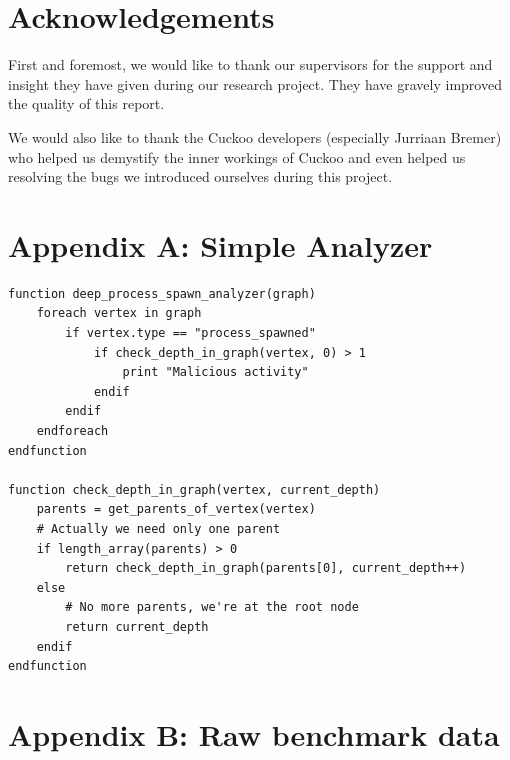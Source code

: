 \documentclass{scrartcl}
\begin{document}
\clearpage

\section*{Acknowledgements}

First and foremost, we would like to thank our supervisors for the support and insight they have given during our research project. They have gravely improved the quality of this report.

We would also like to thank the Cuckoo developers (especially Jurriaan Bremer) who helped us demystify the inner workings of Cuckoo and even helped us resolving the bugs we introduced ourselves during this project.

\clearpage





\clearpage

\section*{Appendix A: Simple Analyzer}


\begin{lstlisting}
function deep_process_spawn_analyzer(graph)
    foreach vertex in graph
        if vertex.type == "process_spawned"
            if check_depth_in_graph(vertex, 0) > 1
                print "Malicious activity"
            endif
        endif
    endforeach
endfunction

function check_depth_in_graph(vertex, current_depth)
    parents = get_parents_of_vertex(vertex)
    # Actually we need only one parent
    if length_array(parents) > 0
        return check_depth_in_graph(parents[0], current_depth++)
    else
        # No more parents, we're at the root node
        return current_depth
    endif
endfunction
\end{lstlisting}

\clearpage

\section*{Appendix B: Raw benchmark data}
\end{document}
